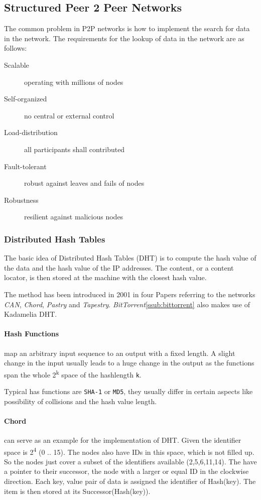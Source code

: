 \subsection{Structured Peer 2 Peer Networks} %
\label{sub:structured_peer_2_peer_networks}
The common problem in P2P networks is how to implement the search for data in the network.
The requirements for the lookup of data in the network are as follows:
\begin{description}
	\item[Scalable] operating with millions of nodes
	\item[Self-organized] no central or external control
	\item[Load-distribution] all participants shall contributed
	\item[Fault-tolerant] robust against leaves and fails of nodes
	\item[Robustness] resilient against malicious nodes 
\end{description}

\subsubsection{Distributed Hash Tables} %
\label{ssub:distributed_hash_tables}
The basic idea of Distributed Hash Tables (DHT) is to compute the hash value of the data
and the hash value of the IP addresses.
The content, or a content locator,
is then stored at the machine with the closest hash value.

The method has been introduced in 2001 in four Papers referring to the networks
\emph{CAN},  \emph{Chord}, \emph{Pastry} and \emph{Tapestry}.
\emph{BitTorrent}\ref{ssub:bittorrent} also makes use of Kadamelia DHT.

	\paragraph{Hash Functions} %
	\label{par:hash_functions}
	map an arbitrary input sequence to an output with a fixed length.
	A slight change in the input usually leads to a huge change in the output
	as the functions span the whole 2\textsuperscript{k} space of the hashlength \texttt{k}. 

	Typical has functions are \texttt{SHA-1} or \texttt{MD5},
	they usually differ in certain aspects like possibility of collisions and the hash value length.

	\paragraph{Chord} %
	\label{par:chord}
	can serve as an example for the implementation of DHT.
	Given the identifier space is 2\textsuperscript{4} (0 .. 15).
	The nodes also have IDs in this space,
	which is not filled up.
	So the nodes just cover a subset of the identifiers available (2,5,6,11,14).
	The have a pointer to their successor,
	the node with a larger or equal ID in the clockwise direction.
	Each key, value pair of data is assigned the identifier of Hash(key).
	The item is then stored at its Successor(Hash(key)).

